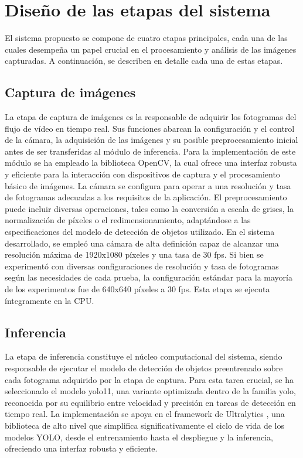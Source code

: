 \documentclass[11pt,spanish,listoffigures,listoftables]{tfgetsinf}
\begin{document}
\section{Diseño de las etapas del sistema} \label{sec:diseno_etapas}
 
El sistema propuesto se compone de cuatro etapas principales, cada una de las cuales desempeña un papel crucial en el procesamiento y análisis de las imágenes capturadas. A continuación, se describen en detalle cada una de estas etapas.

\subsection{Captura de imágenes} \label{sec:captura_imagenes}

La etapa de captura de imágenes es la responsable de adquirir los fotogramas del flujo de vídeo en tiempo real. Sus funciones abarcan la configuración y el control de la cámara, la adquisición de las imágenes y su posible preprocesamiento inicial antes de ser transferidas al módulo de inferencia. Para la implementación de este módulo se ha empleado la biblioteca OpenCV, la cual ofrece una interfaz robusta y eficiente para la interacción con dispositivos de captura y el procesamiento básico de imágenes. La cámara se configura para operar a una resolución y tasa de fotogramas adecuadas a los requisitos de la aplicación. El preprocesamiento puede incluir diversas operaciones, tales como la conversión a escala de grises, la normalización de píxeles o el redimensionamiento, adaptándose a las especificaciones del modelo de detección de objetos utilizado. En el sistema desarrollado, se empleó una cámara de alta definición capaz de alcanzar una resolución máxima de 1920x1080 píxeles y una tasa de 30 fps. Si bien se experimentó con diversas configuraciones de resolución y tasa de fotogramas según las necesidades de cada prueba, la configuración estándar para la mayoría de los experimentos fue de 640x640 píxeles a 30 fps. Esta etapa se ejecuta íntegramente en la CPU.

\subsection{Inferencia} \label{sec:inferencia}
La etapa de inferencia constituye el núcleo computacional del sistema, siendo responsable de ejecutar el modelo de detección de objetos preentrenado sobre cada fotograma adquirido por la etapa de captura. Para esta tarea crucial, se ha seleccionado el modelo \gls{yolo}11, una variante optimizada dentro de la familia \gls{yolo}, reconocida por su equilibrio entre velocidad y precisión en tareas de detección en tiempo real. La implementación se apoya en el framework de Ultralytics \cite{Jocher_Ultralytics_YOLO_2023}, una biblioteca de alto nivel que simplifica significativamente el ciclo de vida de los modelos YOLO, desde el entrenamiento hasta el despliegue y la inferencia, ofreciendo una interfaz robusta y eficiente.
\end{document}
